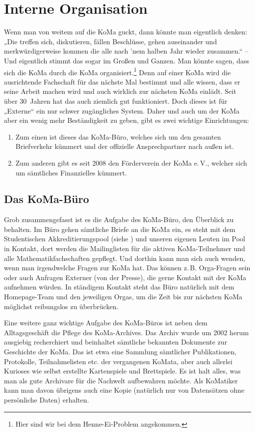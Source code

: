 \chapter{Interne Organisation}

Wenn man von weitem auf die KoMa guckt, dann könnte man
eigentlich denken: „Die treffen sich, diskutieren, fällen Beschlüsse,
gehen auseinander und merkwürdigerweise kommen die alle nach
'nem halben Jahr wieder zusammen.“ – Und eigentlich stimmt
das sogar im Großen und Ganzen. Man könnte sagen, dass sich
die KoMa durch die KoMa organisiert.\footnote{Hier sind wir bei dem Henne-Ei-Problem angekommen.} Denn auf einer KoMa
wird die ausrichtende Fachschaft für das nächste Mal bestimmt
und alle wissen, dass er seine Arbeit machen wird und auch
wirklich zur nächsten KoMa einlädt. Seit über 30~Jahren hat %
das auch ziemlich gut funktioniert.
Doch dieses ist für „Externe“ ein nur schwer zugängliches System.
Daher und auch um der KoMa aber ein wenig mehr Beständigkeit
zu geben, gibt es zwei wichtige Einrichtungen:

\begin{enumerate}
	\item Zum einen ist dieses das KoMa-Büro, welches sich um den gesamten
		Briefverkehr kümmert und der offizielle Ansprechpartner nach außen ist.
	\item Zum anderen gibt es seit 2008 den Förderverein der KoMa e.\,V.,
		welcher sich um sämtliches Finanzielles kümmert.
\end{enumerate}

\section{Das KoMa-Büro}
Grob zusammengefasst ist es die Aufgabe des KoMa-Büro, den Überblick zu
behalten. Im Büro gehen sämtliche Briefe an die KoMa ein, es steht mit dem
Studentischen Akkreditierungspool (siehe ) und unseren
eigenen Leuten im Pool in Kontakt, dort werden die Mailinglisten für die
aktiven KoMa-Teilnehmer und alle Mathematikfachschaften gepflegt. Und dorthin
kann man sich auch wenden, wenn man irgendwelche Fragen zur KoMa hat. Das
können z.\,B. Orga-Fragen sein oder auch Anfragen Externer (von der Presse),
die gerne Kontakt mit der KoMa aufnehmen würden. In ständigem Kontakt steht das
Büro natürlich mit dem Homepage-Team und den jeweiligen Orgas, um die Zeit bis
zur nächsten KoMa möglichst reibungslos zu überbrücken.

Eine weitere ganz wichtige Aufgabe des KoMa-Büros ist neben dem Alltagsgeschäft
die Pflege des KoMa-Archives. Das Archiv wurde um 2002 herum ausgiebig
recherchiert und beinhaltet sämtliche bekannten Dokumente zur Geschichte der
KoMa. Das ist etwa eine Sammlung sämtlicher Publikationen, Protokolle,
Teilnahmelisten etc. der vergangenen KoMata, aber auch allerlei Kurioses wie
selbst erstellte Kartenspiele und Brettspiele. Es ist halt alles, was man als
gute Archivare für die Nachwelt aufbewahren möchte. Als KoMatiker kann man
davon übrigens auch eine Kopie (natürlich nur von Datensätzen ohne persönliche
Daten) erhalten.

